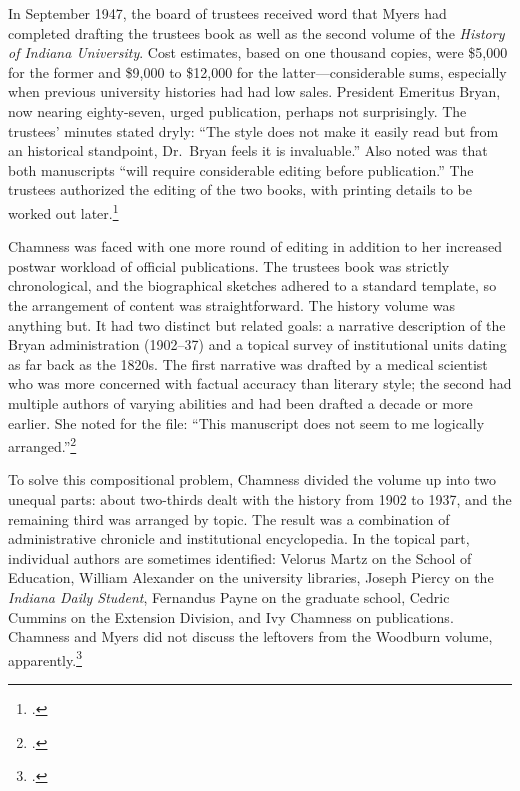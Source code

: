 \documentclass[
  american,
  letterpaper,
]{scrreprt}
\begin{document}
In September 1947, the board of trustees received word that Myers had
completed drafting the trustees book as well as the second volume of the
\emph{History of Indiana University}. Cost estimates, based on one
thousand copies, were \$5,000 for the former and \$9,000 to \$12,000 for
the latter---considerable sums, especially when previous university
histories had had low sales. President Emeritus Bryan, now nearing
eighty-seven, urged publication, perhaps not surprisingly. The trustees'
minutes stated dryly: ``The style does not make it easily read but from
an historical standpoint, Dr.~Bryan feels it is invaluable.'' Also noted
was that both manuscripts ``will require considerable editing before
publication.'' The trustees authorized the editing of the two books,
with printing details to be worked out later.\footnote{.}

Chamness was faced with one more round of editing in addition to her
increased postwar workload of official publications. The trustees book
was strictly chronological, and the biographical sketches adhered to a
standard template, so the arrangement of content was straightforward.
The history volume was anything but. It had two distinct but related
goals: a narrative description of the Bryan administration (1902--37)
and a topical survey of institutional units dating as far back as the
1820s. The first narrative was drafted by a medical scientist who was
more concerned with factual accuracy than literary style; the second had
multiple authors of varying abilities and had been drafted a decade or
more earlier. She noted for the file: ``This manuscript does not seem to
me logically arranged.''\footnote{.}

To solve this compositional problem, Chamness divided the volume up into
two unequal parts: about two-thirds dealt with the history from 1902 to
1937, and the remaining third was arranged by topic. The result was a
combination of administrative chronicle and institutional encyclopedia.
In the topical part, individual authors are sometimes identified:
Velorus Martz on the School of Education, William Alexander on the
university libraries, Joseph Piercy on the \emph{Indiana Daily Student},
Fernandus Payne on the graduate school, Cedric Cummins on the Extension
Division, and Ivy Chamness on publications. Chamness and Myers did not
discuss the leftovers from the Woodburn volume, apparently.\footnote{.}
\end{document}
